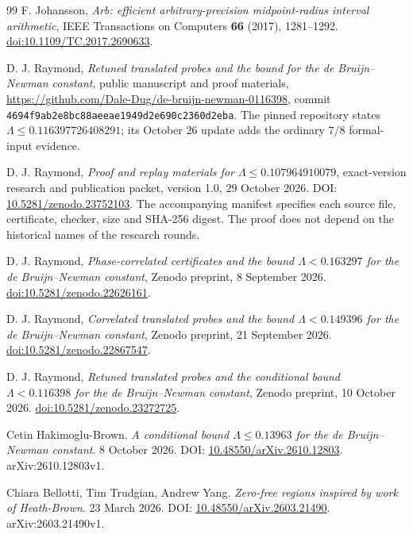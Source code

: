 \documentclass[11pt,a4paper]{article}
\theoremstyle{definition}
\theoremstyle{remark}
\begin{document}
\begin{thebibliography}{99}
F. Johansson, \emph{Arb: efficient arbitrary-precision midpoint-radius
interval arithmetic}, IEEE Transactions on Computers \textbf{66}
(2017), 1281--1292.
\href{https://doi.org/10.1109/TC.2017.2690633}{doi:10.1109/TC.2017.2690633}.

D. J. Raymond, \emph{Retuned translated probes and the bound for the
de Bruijn--Newman constant}, public manuscript and proof materials,
\url{https://github.com/Dale-Dug/de-bruijn-newman-0116398},
commit \nolinkurl{4694f9ab2e8bc88aeeae1949d2e690c2360d2eba}.
The pinned repository states $\Lambda\le0.116397726408291$; its
October 26 update adds the ordinary $7/8$ formal-input evidence.

D. J. Raymond, \emph{Proof and replay materials for
$\Lambda\le0.107964910079$}, exact-version research and publication
packet, version 1.0, 29 October 2026.
DOI: \href{https://doi.org/10.5281/zenodo.23752103}{10.5281/zenodo.23752103}.
The accompanying manifest specifies each
source file, certificate, checker, size and SHA-256 digest. The proof
does not depend on the historical names of the research rounds.

D. J. Raymond, \emph{Phase-correlated certificates and the bound
$\Lambda<0.163297$ for the de Bruijn--Newman constant},
Zenodo preprint, 8 September 2026.
\href{https://doi.org/10.5281/zenodo.22626161}{doi:10.5281/zenodo.22626161}.

D. J. Raymond, \emph{Correlated translated probes and the bound
$\Lambda<0.149396$ for the de Bruijn--Newman constant},
Zenodo preprint, 21 September 2026.
\href{https://doi.org/10.5281/zenodo.22867547}{doi:10.5281/zenodo.22867547}.

D. J. Raymond, \emph{Retuned translated probes and the conditional bound
$\Lambda<0.116398$ for the de Bruijn--Newman constant},
Zenodo preprint, 10 October 2026.
\href{https://doi.org/10.5281/zenodo.23272725}{doi:10.5281/zenodo.23272725}.

Cetin Hakimoglu-Brown. \emph{A conditional bound $\Lambda\leq0.13963$ for the de Bruijn--Newman constant}.
8 October 2026.
DOI: \href{https://doi.org/10.48550/arXiv.2610.12803}{10.48550/arXiv.2610.12803}.
arXiv:2610.12803v1.

Chiara Bellotti, Tim Trudgian, Andrew Yang. \emph{Zero-free regions inspired by work of Heath-Brown}.
23 March 2026.
DOI: \href{https://doi.org/10.48550/arXiv.2603.21490}{10.48550/arXiv.2603.21490}.
arXiv:2603.21490v1.


\end{thebibliography}
\end{document}
